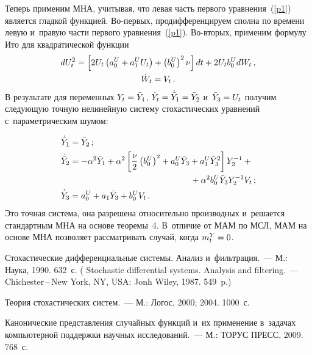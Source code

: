 \begin{multicols}{2}
{Теперь применим МНА, учитывая, что левая часть первого уравнения~(\ref{p1}) является 
гладкой функцией. Во-пер\-вых, продифференцируем сполна по времени левую и~правую 
части первого уравнения~(\ref{p1}). 
Во-вто\-рых, применим формулу Ито для квадратической 
функции
    \begin{multline*}
    dU_t^2 = \lk 2 U_t \left( a_0^U + a_1^U U_t \right) + 
    \left(b_0^U\right)^2 \nu \rk dt + 2 U_t b_0^U dW_t\,,\\
    \dot W_t = V_t\,. %
    \end{multline*}
В результате для переменных $Y_t \hm= \bar Y_1$, 
$\dot Y_t\hm =\dot{\bar Y}_1 \hm= \bar Y_2$ и~$ \bar Y_3 \hm= U_t$ получим 
следующую точную нелинейную систему стохастических уравнений с~параметрическим шумом:

\noindent
    \begin{align*}
    \dot{\bar Y}_1&=\bar Y_2\,;\\ 
    \dot{\bar Y}_2& =-\alp^2 \bar Y_1 + 
    \alp^2 \lk \fr{\nu}{2} \left(b_0^U\right)^2 + a_0^U \bar Y_3 + 
    a_1^U \bar Y_3^2\rk Y_2^{-1}+ {}\\
    &\hspace*{50mm}{}+\alp^2 b_0^U \bar Y_3 Y_2^{-1} V_t\,;
   \\
    \dot{\bar Y}_3 &= a_0^U + a_1 \bar Y_3 + b_0^U V_t\,. 
    \end{align*}
Это точная система, она разрешена относительно производных 
и~решается стандартным МНА на основе теоремы~4. 
В~отличие от МАМ по МСЛ, МАМ на основе МНА позволяет рассматривать случай, 
когда $m_t^Y\hm=0$.

}

{\small\frenchspacing
 {%
 \begin{thebibliography}{9}

Стохастические дифференциальные системы. Анализ и~фильтрация.~--- М.:
Наука,  1990.  632~с. 
 ( Stochastic differential systems.
Analysis and filtering.~--- Chichester\,--\,New York, NY, USA: Jonh Wiley, 1987.
549~p.)

Теория стохастических систем.~--- М.: Логос, 2000; 2004. 1000~с.

Канонические представления случайных функций и~их применение 
в~задачах компьютерной поддержки научных исследований.~--- М.: ТОРУС
ПРЕСС, 2009. 768~с.



\end{thebibliography}}}
\end{multicols}
